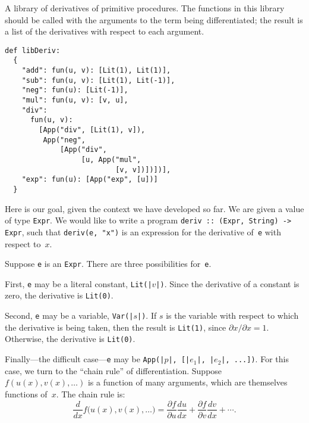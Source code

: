 \documentclass[11pt, a4paper]{article}
\newcommand{\cd}[1]{\texttt{#1}}
\begin{document}
\begin{marginfigure}
  \caption{A library of derivatives of primitive
    procedures. The functions in this library should be called with
    the arguments to the term being differentiated; the result is a
    list of the derivatives with respect to each argument.\label{fig:deriv-library}}
  \footnotesize
\begin{verbatim}
def libDeriv:
  {
    "add": fun(u, v): [Lit(1), Lit(1)],
    "sub": fun(u, v): [Lit(1), Lit(-1)],
    "neg": fun(u): [Lit(-1)],
    "mul": fun(u, v): [v, u],
    "div": 
      fun(u, v):
        [App("div", [Lit(1), v]),
         App("neg",
             [App("div",
                  [u, App("mul",
                          [v, v])])])],
    "exp": fun(u): [App("exp", [u])]
  }
\end{verbatim}
\end{marginfigure}
Here is our goal, given the context we have developed so far. We are
given a value of type \cd{Expr}. We would like to write a program
\cd{deriv :: (Expr, String) -> Expr}, such that \cd{deriv(e, "x")} is an expression
for the derivative of~\cd{e} with respect to~$x$.

Suppose \cd{e} is an \cd{Expr}. There are three possibilities
for~\cd{e}.

First, \cd{e} may be a literal constant, \cd{Lit(|$v$|)}. Since the
derivative of a constant is zero, the derivative is \cd{Lit(0)}.

Second, \cd{e} may be a variable, \cd{Var(|$s$|)}. If $s$ is the
variable with respect to which the derivative is being taken, then the
result is \cd{Lit(1)}, since $\partial x/\partial x = 1$. Otherwise, the derivative
is \cd{Lit(0)}.

Finally---the difficult case---\cd{e} may be \cd{App(|$p$|, [|$e_1$|,
  |$e_2$|, ...])}. For this case, we turn to the ``chain rule'' of
differentiation. Suppose $f(u(x), v(x), \dots)$ is a function of many
arguments, which are themselves functions of~$x$. The chain rule is:
\begin{equation}\label{eq:chain-rule}
  \frac{d}{dx}f\bigl(u(x), v(x), \dotsc\bigr) =
  \frac{\partial f}{\partial u} \frac{du}{dx} 
  + \frac{\partial f}{\partial v}\frac{dv}{dx}
  + \dotsb. 
\end{equation}
\end{document}
